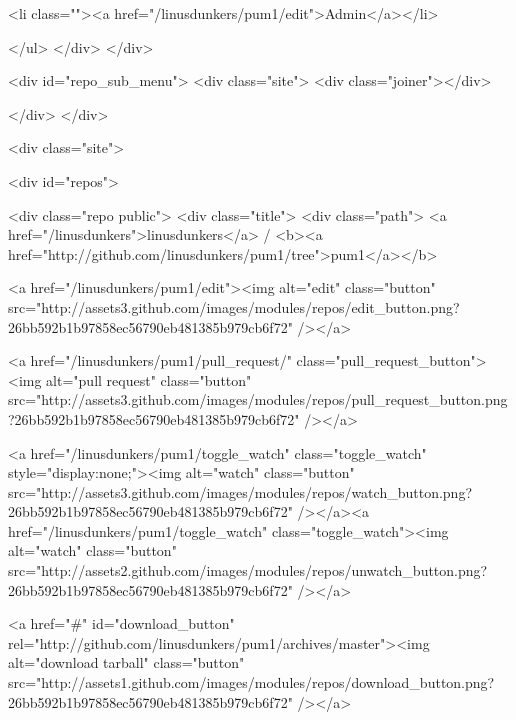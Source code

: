             
              <li class=""><a href="/linusdunkers/pum1/edit">Admin</a></li>
            

          
        </ul>
      </div>
    </div>
  

  <div id="repo_sub_menu">
    <div class="site">
      <div class="joiner"></div>
      

      

      

      
    </div>
  </div>

  <div class="site">
    





<div id="repos">
  




  <div class="repo public">
    <div class="title">
      <div class="path">
        <a href="/linusdunkers">linusdunkers</a> / <b><a href="http://github.com/linusdunkers/pum1/tree">pum1</a></b>

        

          
            <a href="/linusdunkers/pum1/edit"><img alt="edit" class="button" src="http://assets3.github.com/images/modules/repos/edit_button.png?26bb592b1b97858ec56790eb481385b979cb6f72" /></a>
          

          
            
              
                <a href="/linusdunkers/pum1/pull_request/" class="pull_request_button"><img alt="pull request" class="button" src="http://assets3.github.com/images/modules/repos/pull_request_button.png?26bb592b1b97858ec56790eb481385b979cb6f72" /></a>
              
            

            
          

          <a href="/linusdunkers/pum1/toggle_watch" class="toggle_watch" style="display:none;"><img alt="watch" class="button" src="http://assets3.github.com/images/modules/repos/watch_button.png?26bb592b1b97858ec56790eb481385b979cb6f72" /></a><a href="/linusdunkers/pum1/toggle_watch" class="toggle_watch"><img alt="watch" class="button" src="http://assets2.github.com/images/modules/repos/unwatch_button.png?26bb592b1b97858ec56790eb481385b979cb6f72" /></a>

          
            <a href="#" id="download_button" rel="http://github.com/linusdunkers/pum1/archives/master"><img alt="download tarball" class="button" src="http://assets1.github.com/images/modules/repos/download_button.png?26bb592b1b97858ec56790eb481385b979cb6f72" /></a>
          
